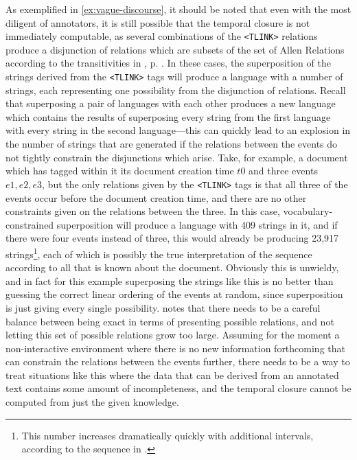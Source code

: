 \documentclass[a4paper,12pt,leqno]{article}
\begin{document}
As exemplified in \cref{ex:vague-discourse}, it should be noted that even with the most diligent of annotators, it is still possible that the temporal closure is not immediately computable, as several combinations of the \verb|<TLINK>| relations produce a disjunction of relations which are subsets of the set of Allen Relations according to the transitivities in , p. \pageref{tab:allen-trans-table}. In these cases, the superposition of the strings derived from the \verb|<TLINK>| tags will produce a language with a number of strings, each representing one possibility from the disjunction of relations. Recall that superposing a pair of languages with each other produces a new language which contains the results of superposing every string from the first language with every string in the second language---this can quickly lead to an explosion in the number of strings that are generated if the relations between the events do not tightly constrain the disjunctions which arise. Take, for example, a document which has tagged within it its document creation time $t0$ and three events $e1, e2, e3$, but the only relations given by the \verb|<TLINK>| tags is that all three of the events occur before the document creation time, and there are no other constraints given on the relations between the three. In this case, vocabulary-constrained superposition will produce a language with 409 strings in it, and if there were four events instead of three, this would already be producing 23,917 strings\footnote{This number increases dramatically quickly with additional intervals, according to the sequence in \citet{oeisA055203}.}, each of which is possibly the true interpretation of the sequence according to all that is known about the document. Obviously this is unwieldy, and in fact for this example superposing the strings like this is no better than guessing the correct linear ordering of the events at random, since superposition is just giving every single possibility. \citet{derczynski2016representation} notes that there needs to be a careful balance between being exact in terms of presenting possible relations, and not letting this set of possible relations grow too large. Assuming for the moment a non-interactive environment where there is no new information forthcoming that can constrain the relations between the events further, there needs to be a way to treat situations like this where the data that can be derived from an annotated text contains some amount of incompleteness, and the temporal closure cannot be computed from just the given knowledge.
\end{document}
